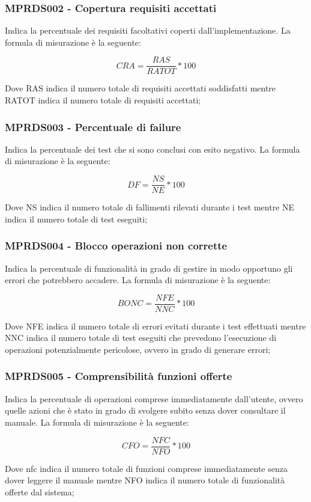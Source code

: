 {\subsubsection{MPRDS002 - Copertura requisiti accettati}
Indica la percentuale dei requisiti facoltativi coperti dall'implementazione. La formula di misurazione è la seguente:
\begin{center}
    \begin{displaymath}
        CRA = \frac{RAS}{RATOT} * 100
    \end{displaymath}
\end{center}
Dove RAS indica il numero totale di requisiti accettati soddisfatti mentre RATOT indica il numero totale di requisiti accettati;
\subsubsection{MPRDS003 - Percentuale di failure}
Indica la percentuale dei test che si sono conclusi con esito negativo. La formula di misurazione è la seguente:
\begin{center}
    \begin{displaymath}
        DF = \frac{NS}{NE} * 100
    \end{displaymath}
\end{center}
Dove NS indica il numero totale di fallimenti rilevati durante i test mentre NE indica il numero totale di test eseguiti;
\subsubsection{MPRDS004 - Blocco operazioni non corrette}
Indica la percentuale di funzionalità in grado di gestire in modo opportuno gli errori che potrebbero accadere. La formula di misurazione è la seguente:
\begin{center}
    \begin{displaymath}
        BONC = \frac{NFE}{NNC} * 100
    \end{displaymath}
\end{center}
Dove NFE indica il numero totale di errori evitati durante i test effettuati mentre NNC indica il numero totale di test eseguiti che prevedono l'esecuzione di operazioni potenzialmente pericolose, ovvero in grado di generare errori;
\subsubsection{MPRDS005 - Comprensibilità funzioni offerte}
Indica la percentuale di operazioni comprese immediatamente dall'utente, ovvero quelle azioni che è stato in grado di svolgere subito senza dover consultare il manuale. La formula di misurazione è la seguente:
\begin{center}
    \begin{displaymath}
        CFO = \frac{NFC}{NFO} * 100
    \end{displaymath}
\end{center}
Dove nfc indica il numero totale di funzioni comprese immediatamente senza dover leggere il manuale mentre NFO indica il numero totale di funzionalità offerte dal sistema;
}
